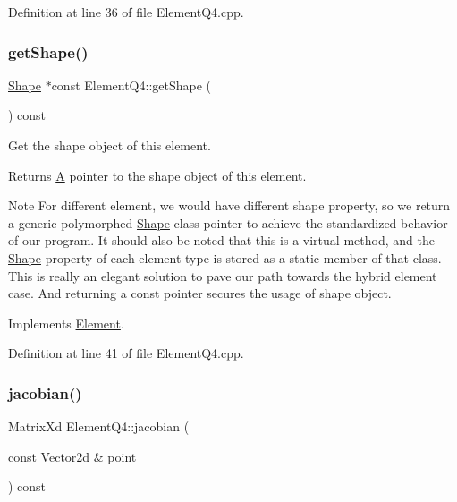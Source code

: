 Definition at line 36 of file Element\+Q4.\+cpp.

\mbox{\label{class_element_q4_a3e2b762e838f20a10c184f55d3d4ff85}} 
\subsubsection{\texorpdfstring{get\+Shape()}{getShape()}}
{\footnotesize\ttfamily \mbox{\hyperlink{class_shape}{Shape}} $\ast$const Element\+Q4\+::get\+Shape (\begin{DoxyParamCaption}{ }\end{DoxyParamCaption}) const\hspace{0.3cm}{\ttfamily [virtual]}}



Get the shape object of this element. 

\begin{DoxyReturn}{Returns}
\mbox{\hyperlink{class_a}{A}} pointer to the shape object of this element.
\end{DoxyReturn}
\begin{DoxyNote}{Note}
For different element, we would have different shape property, so we return a generic polymorphed \mbox{\hyperlink{class_shape}{Shape}} class pointer to achieve the standardized behavior of our program. It should also be noted that this is a virtual method, and the \mbox{\hyperlink{class_shape}{Shape}} property of each element type is stored as a static member of that class. This is really an elegant solution to pave our path towards the hybrid element case. And returning a const pointer secures the usage of shape object. 
\end{DoxyNote}


Implements \mbox{\hyperlink{class_element_a54c5c297abff4ac3abacd815342a9645}{Element}}.



Definition at line 41 of file Element\+Q4.\+cpp.

\mbox{\label{class_element_q4_a1347c3ce4ef1c34a16aa72fdf593932d}} 
\subsubsection{\texorpdfstring{jacobian()}{jacobian()}}
{\footnotesize\ttfamily Matrix\+Xd Element\+Q4\+::jacobian (\begin{DoxyParamCaption}\item[{const Vector2d \&}]{point }\end{DoxyParamCaption}) const\hspace{0.3cm}{\ttfamily [virtual]}}



